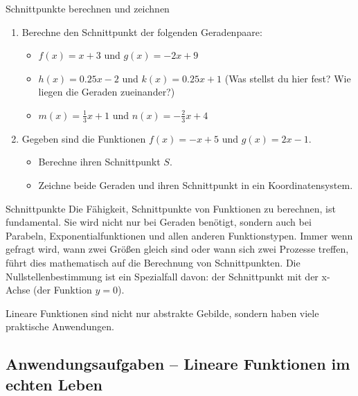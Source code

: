 \begin{aufgabenumgebung}{Schnittpunkte berechnen und zeichnen}
\begin{enumerate}
    \item Berechne den Schnittpunkt der folgenden Geradenpaare:
        \begin{itemize}
            \item $f(x) = x + 3$ und $g(x) = -2x + 9$
            \item $h(x) = 0.25x - 2$ und $k(x) = 0.25x + 1$ (Was stellst du hier fest? Wie liegen die Geraden zueinander?)
            \item $m(x) = \frac{1}{3}x + 1$ und $n(x) = -\frac{2}{3}x + 4$
        \end{itemize}
    \item Gegeben sind die Funktionen $f(x) = -x+5$ und $g(x) = 2x-1$.
        \begin{itemize}
            \item Berechne ihren Schnittpunkt $S$.
            \item Zeichne beide Geraden und ihren Schnittpunkt in ein Koordinatensystem.
        \end{itemize}
\end{enumerate}
\end{aufgabenumgebung}

\begin{warumwichtigumgebung}{Schnittpunkte}
Die Fähigkeit, Schnittpunkte von Funktionen zu berechnen, ist fundamental. Sie wird nicht nur bei Geraden benötigt, sondern auch bei Parabeln, Exponentialfunktionen und allen anderen Funktionstypen. Immer wenn gefragt wird, wann zwei Größen gleich sind oder wann sich zwei Prozesse treffen, führt dies mathematisch auf die Berechnung von Schnittpunkten. Die Nullstellenbestimmung ist ein Spezialfall davon: der Schnittpunkt mit der x-Achse (der Funktion $y=0$).
\end{warumwichtigumgebung}



Lineare Funktionen sind nicht nur abstrakte Gebilde, sondern haben viele praktische Anwendungen.

\subsection{Anwendungsaufgaben – Lineare Funktionen im echten Leben}

